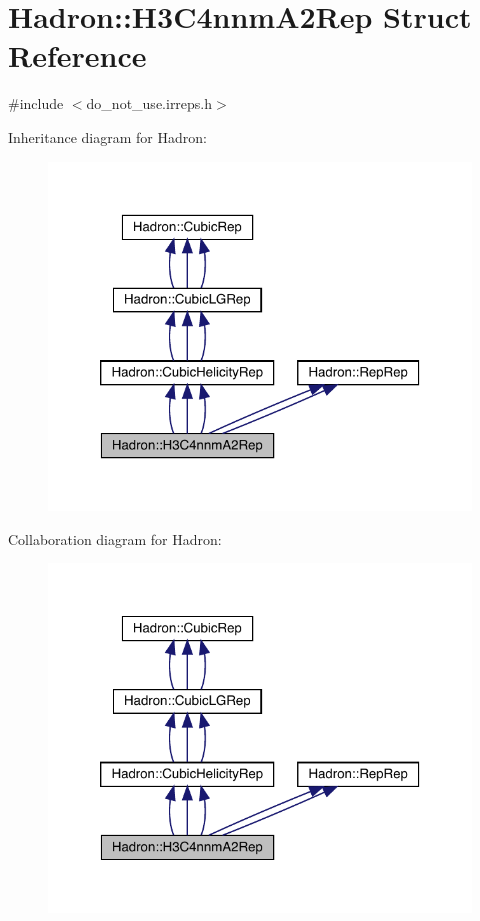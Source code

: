 \hypertarget{structHadron_1_1H3C4nnmA2Rep}{}\section{Hadron\+:\+:H3\+C4nnm\+A2\+Rep Struct Reference}
\label{structHadron_1_1H3C4nnmA2Rep}


{\ttfamily \#include $<$do\+\_\+not\+\_\+use.\+irreps.\+h$>$}



Inheritance diagram for Hadron\+:
\nopagebreak
\begin{figure}[H]
\begin{center}
\leavevmode
\includegraphics[width=320pt]{d0/dd0/structHadron_1_1H3C4nnmA2Rep__inherit__graph}
\end{center}
\end{figure}


Collaboration diagram for Hadron\+:
\nopagebreak
\begin{figure}[H]
\begin{center}
\leavevmode
\includegraphics[width=320pt]{d0/df5/structHadron_1_1H3C4nnmA2Rep__coll__graph}
\end{center}
\end{figure}
